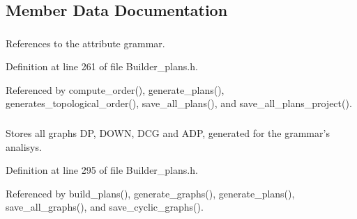 \subsection{Member Data Documentation}
\hypertarget{classgenevalmag_1_1Builder__plans_247759aafc18133de19c8c95afb9c2d5}{
\subsubsection[{attr\_\-grammar}]{}}
\label{classgenevalmag_1_1Builder__plans_247759aafc18133de19c8c95afb9c2d5}


References to the attribute grammar. 



Definition at line 261 of file Builder\_\-plans.h.

Referenced by compute\_\-order(), generate\_\-plans(), generates\_\-topological\_\-order(), save\_\-all\_\-plans(), and save\_\-all\_\-plans\_\-project().\hypertarget{classgenevalmag_1_1Builder__plans_c1d890f07dc50cc1d7383a73bb5bb5af}{
\subsubsection[{build\_\-graphs}]{}}
\label{classgenevalmag_1_1Builder__plans_c1d890f07dc50cc1d7383a73bb5bb5af}


Stores all graphs DP, DOWN, DCG and ADP, generated for the grammar's analisys. 



Definition at line 295 of file Builder\_\-plans.h.

Referenced by build\_\-plans(), generate\_\-graphs(), generate\_\-plans(), save\_\-all\_\-graphs(), and save\_\-cyclic\_\-graphs().\hypertarget{classgenevalmag_1_1Builder__plans_ac38711883bb0acd21483d2a918e0f0d}{
\subsubsection[{contexts\_\-uniques}]{}}
\label{classgenevalmag_1_1Builder__plans_ac38711883bb0acd21483d2a918e0f0d}


